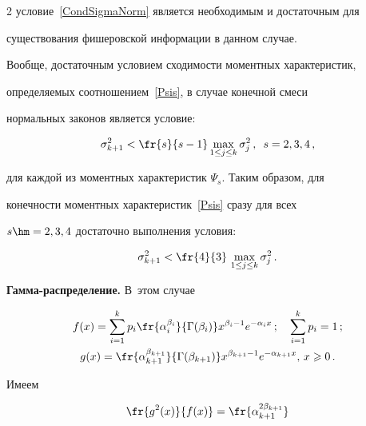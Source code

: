 \begin{multicols}{2}
условие~\eqref{CondSigmaNorm} является необходимым и достаточным для

существования фишеровской информации в данном случае.



Вообще, достаточным условием сходимости моментных характеристик,

определяемых соотношением~\eqref{Psis}, в случае конечной смеси

нормальных законов является условие:



\noindent

$$

\sigma_{k+1}^2<\fr{s}{s-1}\max_{1\le j\le

k}\sigma_j^2\,,\enskip s=2,3,4\,,

$$

для каждой из моментных характеристик $\Psi_s$. Таким образом, для

конечности моментных характеристик~\eqref{Psis} сразу для всех

$s\hm=2,3,4$ достаточно выполнения условия:

\begin{equation}

\label{CondPsiNorm} 

\sigma_{k+1}^2<\fr{4}{3}\,\max_{1\le j\le

k}\sigma_j^2\,.

\end{equation}



\textbf{Гамма-распределение.} В~этом случае

\begin{gather*}

f(x)=\sum\limits_{i=1}^{k}p_i\fr{\alpha_i^{\beta_i}}

{\Gamma(\beta_i)}x^{\beta_i-1}e^{-\alpha_ix}\,;

\quad\sum\limits_{i=1}^{k}p_i=1\,;\\

g(x)=\fr{\alpha_{k+1}^{\beta_{k+1}}}

{\Gamma(\beta_{k+1})}x^{\beta_{k+1}-1}e^{-\alpha_{k+1}x},\,x\geqslant0\,.

\end{gather*}

Имеем

\begin{multline*}

\fr{g^2(x)}{f(x)}=\fr{\alpha_{k+1}^{2\beta_{k+1}}}


\end{multline*}
\end{multicols}
